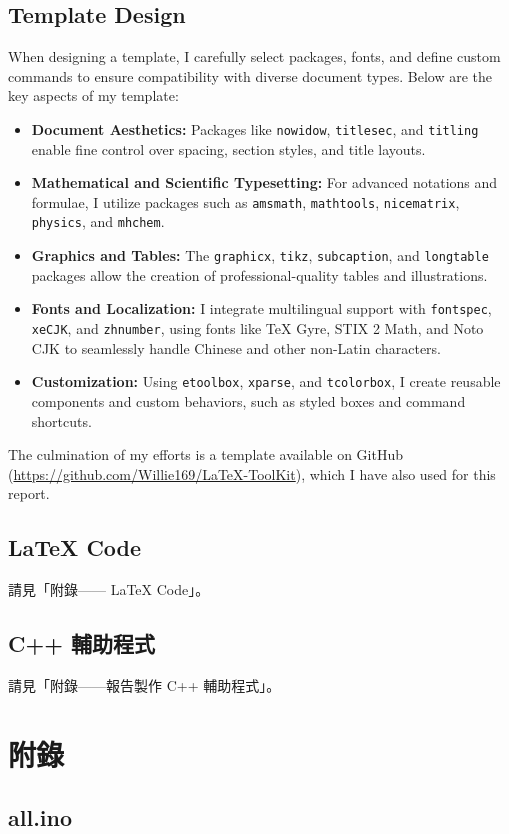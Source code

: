 \documentclass[a4paper,12pt]{article}
\newcounter{xeCJK}
\newcounter{Fonts}
\begin{document}
\subsection{Template Design}
When designing a template, I carefully select packages, fonts, and define custom commands to ensure compatibility with diverse document types. Below are the key aspects of my template:  
\begin{itemize}  
\item \textbf{Document Aesthetics:} Packages like \texttt{nowidow}, \texttt{titlesec}, and \texttt{titling} enable fine control over spacing, section styles, and title layouts.  
\item \textbf{Mathematical and Scientific Typesetting:} For advanced notations and formulae, I utilize packages such as \texttt{amsmath}, \texttt{mathtools}, \texttt{nicematrix}, \texttt{physics}, and \texttt{mhchem}.  
\item \textbf{Graphics and Tables:} The \texttt{graphicx}, \texttt{tikz}, \texttt{subcaption}, and \texttt{longtable} packages allow the creation of professional-quality tables and illustrations.  
\item \textbf{Fonts and Localization:} I integrate multilingual support with \texttt{fontspec}, \texttt{xeCJK}, and \texttt{zhnumber}, using fonts like TeX Gyre, STIX 2 Math, and Noto CJK to seamlessly handle Chinese and other non-Latin characters.  \item \textbf{Customization:} Using \texttt{etoolbox}, \texttt{xparse}, and \texttt{tcolorbox}, I create reusable components and custom behaviors, such as styled boxes and command shortcuts.  
\end{itemize}
The culmination of my efforts is a template available on GitHub (\href{https://github.com/Willie169/LaTeX-ToolKit}{https://github.com/Willie169/LaTeX-ToolKit}), which I have also used for this report.  
\subsection{\LaTeX{} Code}
請見「附錄—— \LaTeX{} Code」。
\subsection{C++ 輔助程式}
請見「附錄——報告製作 C++ 輔助程式」。

\section{附錄}
\subsection{all.ino}

\end{document}
